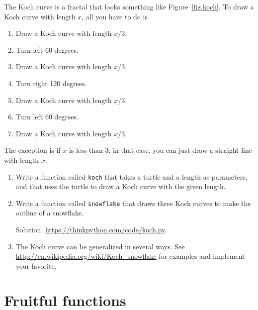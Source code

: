\documentclass[10pt]{book}
\begin{document}
\begin{exercise}

The Koch curve is a fractal that looks something like
Figure~\ref{fig.koch}.  To draw a Koch curve with length $x$, all you
have to do is

\begin{enumerate}

\item Draw a Koch curve with length $x/3$.

\item Turn left 60 degrees.

\item Draw a Koch curve with length $x/3$.

\item Turn right 120 degrees.

\item Draw a Koch curve with length $x/3$.

\item Turn left 60 degrees.

\item Draw a Koch curve with length $x/3$.

\end{enumerate}

The exception is if $x$ is less than 3: in that case,
you can just draw a straight line with length $x$.

\begin{enumerate}

\item Write a function called {\tt koch} that takes a turtle and
a length as parameters, and that uses the turtle to draw a Koch
curve with the given length.

\item Write a function called {\tt snowflake} that draws three
Koch curves to make the outline of a snowflake.

Solution: \url{https://thinkpython.com/code/koch.py}.

\item The Koch curve can be generalized in several ways.  See
\url{http://en.wikipedia.org/wiki/Koch_snowflake} for examples and
implement your favorite.

\end{enumerate}
\end{exercise}


\chapter{Fruitful functions}
\label{fruitchap}
\end{document}
